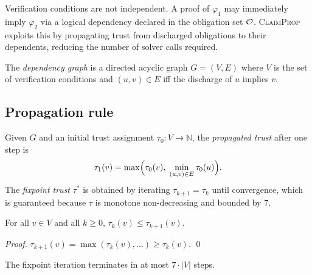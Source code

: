 \documentclass[11pt]{article}
\newcommand{\PropAlg}{\textsc{ClaimProp}}    %
\begin{document}
Verification conditions are not independent.
A proof of $\varphi_1$ may immediately imply $\varphi_2$ via a
logical dependency declared in the obligation set $\mathcal{O}$.
\PropAlg{} exploits this by propagating trust from discharged
obligations to their dependents, reducing the number of solver
calls required.

\begin{definition}\label{def:dep-graph}
The \emph{dependency graph} is a directed acyclic graph
$G = (V, E)$ where $V$ is the set of verification conditions
and $(u, v) \in E$ iff the discharge of $u$ implies $v$.
\end{definition}

\subsection{Propagation rule}

\begin{definition}\label{def:trust-prop}
Given $G$ and an initial trust assignment
$\tau_0 : V \to \mathbb{N}$,
the \emph{propagated trust} after one step is
\[
  \tau_1(v) = \max\Bigl(\tau_0(v),\;
    \min_{(u,v) \in E} \tau_0(u)\Bigr).
\]
The \emph{fixpoint trust} $\tau^*$ is obtained by iterating
$\tau_{k+1} = \tau_k$ until convergence, which is guaranteed
because $\tau$ is monotone non-decreasing and bounded by $7$.
\end{definition}

\begin{theorem}\label{thm:prop-mono}
For all $v \in V$ and all $k \geq 0$,
$\tau_k(v) \leq \tau_{k+1}(v)$.
\end{theorem}
\begin{proof}
$\tau_{k+1}(v) = \max(\tau_k(v), \ldots) \geq \tau_k(v)$.
\qed
\end{proof}

\begin{corollary}[Termination]\label{cor:termination}
The fixpoint iteration terminates in at most $7 \cdot |V|$ steps.
\end{corollary}
\end{document}
